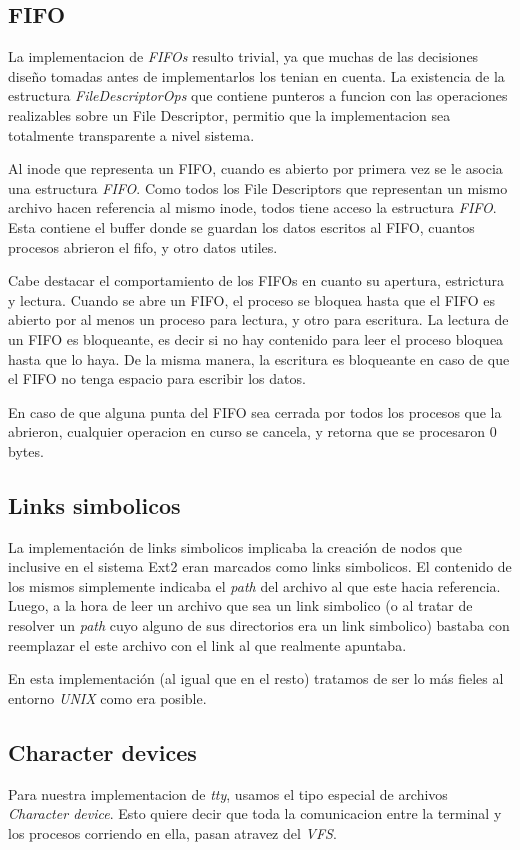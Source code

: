\documentclass[a4paper,10pt]{article}
\begin{document}
\subsection{FIFO}
La implementacion de \textit{FIFOs} resulto trivial, ya que muchas de las decisiones diseño tomadas antes de implementarlos los tenian en cuenta.
La existencia de la estructura \textit{FileDescriptorOps} que contiene punteros a funcion con las operaciones realizables sobre un File Descriptor, permitio que la implementacion sea totalmente transparente a nivel sistema.

Al inode que representa un FIFO, cuando es abierto por primera vez se le asocia una estructura \textit{FIFO}.
Como todos los File Descriptors que representan un mismo archivo hacen referencia al mismo inode, todos tiene acceso la estructura \textit{FIFO}.
Esta contiene el buffer donde se guardan los datos escritos al FIFO, cuantos procesos abrieron el fifo, y otro datos utiles.

Cabe destacar el comportamiento de los FIFOs en cuanto su apertura, estrictura y lectura.
Cuando se abre un FIFO, el proceso se bloquea hasta que el FIFO es abierto por al menos un proceso para lectura, y otro para escritura.
La lectura de un FIFO es bloqueante, es decir si no hay contenido para leer el proceso bloquea hasta que lo haya.
De la misma manera, la escritura es bloqueante en caso de que el FIFO no tenga espacio para escribir los datos.

En caso de que alguna punta del FIFO sea cerrada por todos los procesos que la abrieron, cualquier operacion en curso se cancela, y retorna que se procesaron 0 bytes.

\subsection{Links simbolicos}
La implementación de links simbolicos implicaba la creación de nodos que inclusive en el sistema Ext2 eran marcados
como links simbolicos. El contenido de los mismos simplemente indicaba el \textit{path} del archivo al que este
hacia referencia.
Luego, a la hora de leer un archivo que sea un link simbolico (o al tratar de resolver un \textit{path} cuyo alguno
de sus directorios era un link simbolico) bastaba con reemplazar el este archivo con el link al que realmente
apuntaba.

En esta implementación (al igual que en el resto) tratamos de ser lo más fieles al entorno \textit{UNIX} como 
era posible.

\subsection{Character devices}
Para nuestra implementacion de \textit{tty}, usamos el tipo especial de archivos \textit{Character device}.
Esto quiere decir que toda la comunicacion entre la terminal y los procesos corriendo en ella, pasan atravez del \textit{VFS}.
\end{document}
